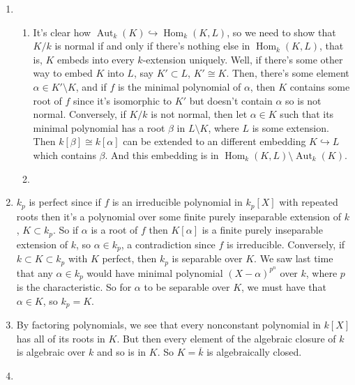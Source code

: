 \documentclass{article}
\DeclareMathOperator\Hom{Hom}
\DeclareMathOperator\Aut{Aut}
\begin{document}
\begin{enumerate}
   \item
      \begin{enumerate}
         \item It's clear how $\Aut_k(K) \hookrightarrow \Hom_k(K,L)$, so we
            need to show that $K/k$ is normal if and only if there's nothing
            else in $\Hom_k(K,L)$, that is, $K$ embeds into every $k$-extension
            uniquely. Well, if there's some other way to embed $K$ into $L$, say
            $K' \subset L$, $K' \cong K$. Then, there's some element $\alpha
            \in K' \setminus K$, and if $f$ is the minimal polynomial of
            $\alpha$, then $K$ contains some root of $f$ since it's isomorphic
            to $K'$ but doesn't contain $\alpha$ so is not normal. Conversely,
            if $K/k$ is not normal, then let $\alpha \in K$ such that its
            minimal polynomial has a root $\beta$ in $L \setminus K$, where $L$
            is some extension. Then $k[\beta] \cong k[\alpha]$ can be extended
            to an different embedding $K \hookrightarrow L$ which contains
            $\beta$. And this embedding is in $\Hom_k(K,L) \setminus \Aut_k(K)$.

         \item 
      \end{enumerate}

   \item $k_p$ is perfect since if $f$ is an irreducible polynomial in $k_p[X]$
      with repeated roots then it's a polynomial over some finite purely
      inseparable extension of $k$, $K \subset k_p$. So if $\alpha$ is a root of
      $f$ then $K[\alpha]$ is a finite purely inseparable extension of $k$, so
      $\alpha \in k_p$, a contradiction since $f$ is irreducible. Conversely, if
      $k \subset K \subset k_p$ with $K$ perfect, then $k_p$ is separable over
      $K$. We saw last time that any $\alpha \in k_p$ would have minimal
      polynomial $(X-\alpha)^{p^n}$ over $k$, where $p$ is the characteristic.
      So for $\alpha$ to be separable over $K$, we must have that $\alpha \in
      K$, so $k_p = K$.

   \item By factoring polynomials, we see that every nonconstant polynomial in
      $k[X]$ has all of its roots in $K$. But then every element of the
      algebraic closure of $k$ is algebraic over $k$ and so is in $K$. So $K =
      \overline k$ is algebraically closed.

   \item
      \begin{enumerate}
     

\end{enumerate}
\end{enumerate}
\end{document}

